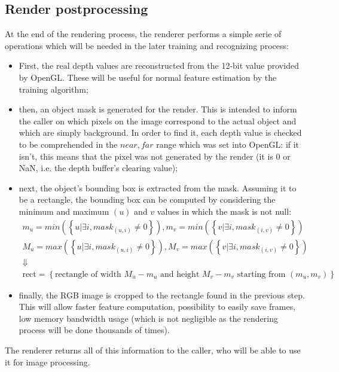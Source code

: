 \subsection{Render postprocessing}
At the end of the rendering process, the renderer performs a simple serie of
operations which will be needed in the later training and recognizing process:

\begin{itemize}
  \item{
    First, the real depth values are reconstructed from the 12-bit value
    provided by OpenGL. These will be useful for normal feature estimation by
  the training algorithm;}
  \item{then, an object mask is generated for the render. This is intended to inform
the caller on which pixels on the image correspond to the actual object and
which are simply background. In order to find it, each depth value is checked to
be comprehended in the $near,far$ range which was set into OpenGL: if it isn't,
this means that the pixel was not generated by the render (it is 0 or NaN, i.e.
the depth buffer's clearing value);}
  \item{next, the object's bounding box is extracted from the mask. Assuming it
to be a rectangle, the bounding box can be computed by considering the minimum
and maximum $(u)$ and $v$ values in which the mask is not null:
\[
  \begin{array}{c}
    m_u=min\left(\left\{u | \exists i, mask_{(u,i)}\neq 0\right\}\right),
    m_v=min\left(\left\{v | \exists i, mask_{(i,v)}\neq 0\right\}\right) \\
    M_u=max\left(\left\{u | \exists i, mask_{(u,i)}\neq 0\right\}\right),
    M_v=max\left(\left\{v | \exists i, mask_{(i,v)}\neq 0\right\}\right) \\
    \Downarrow \\
    \text{rect}=\left\{\text{rectangle of width } M_u-m_u \text{ and height } M_v-m_v
    \text{ starting from } (m_u,m_v)\right\}
  \end{array}
\]
}
\item{finally, the RGB image is cropped to the rectangle found in the previous
    step. This will allow faster feature computation, possibility to easily save
    frames, low memory bandwidth usage (which is not negligible as the rendering
  process will be done thousands of times).}
\end{itemize}

The renderer returns all of this information to the caller, who will be able to
use it for image processing.
